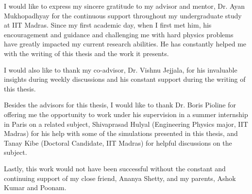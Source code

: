 I would like to express my sincere gratitude to my advisor and mentor, Dr. Ayan Mukhopadhyay\footnotemark{} for the continuous support throughout my undergraduate study at IIT Madras. Since my first academic day, when I first met him, his encouragement and guidance and challenging me with hard physics problems have greatly impacted my current research abilities. He has constantly helped me with the writing of this thesis and the work it presents.

I would also like to thank my co-advisor, Dr. Vishnu Jejjala\footnotemark{}, for his invaluable insights during weekly discussions and his constant support during the writing of this thesis.

Besides the advisors for this thesis, I would like to thank Dr. Boris Pioline\footnotemark{} for offering me the opportunity to work under his supervision in a summer internship in Paris on a related subject, Shivaprasad Hulyal (Engineering Physics major, IIT Madras) for his help with some of the simulations presented in this thesis, and Tanay Kibe (Doctoral Candidate, IIT Madras) for helpful discussions on the subject.

Lastly, this work would not have been successful without the constant and continuing support of my close friend, Ananya Shetty, and my parents, Ashok Kumar and Poonam.